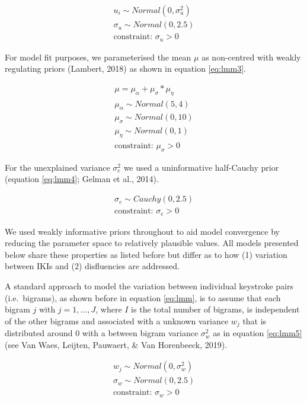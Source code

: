 \documentclass[english,jou,floatsintext]{apa7}
\begin{document}
\[
\tag{2}
\begin{aligned}
u_i \sim Normal(0,\sigma_u^2)\\
\sigma_u \sim Normal(0,2.5)\\
\text{constraint: } \sigma_u >0 
\end{aligned}
\label{eq:lmm2}
\]

For model fit purposes, we parameterised the mean \(\mu\) as non-centred with weakly regulating priors (Lambert, 2018) as shown in equation \ref{eq:lmm3}.

\[
\tag{3}
\begin{aligned}
\mu = \mu_{\alpha} + \mu_{\sigma} * \mu_{\eta}\\
\mu_{\alpha} \sim Normal(5,4)\\
\mu_{\sigma} \sim Normal(0,10)\\
\mu_{\eta} \sim Normal(0,1)\\
\text{constraint: }\mu_{\sigma}>0 
\end{aligned}
\label{eq:lmm3}
\]

For the unexplained variance \(\sigma_e^2\) we used a uninformative half-Cauchy prior (equation \ref{eq:lmm4}; Gelman et al., 2014).

\[
\tag{4}
\begin{aligned}
\sigma_e \sim Cauchy(0,2.5)\\
\text{constraint: }\sigma_e>0 
\end{aligned}
\label{eq:lmm4}
\]

We used weakly informative priors throughout to aid model convergence by reducing the parameter space to relatively plausible values. All models presented below share these properties as listed before but differ as to how (1) variation between IKIs and (2) disfluencies are addressed.

A standard approach to model the variation between individual keystroke pairs (i.e.~bigrams), as shown before in equation \ref{eq:lmm}, is to assume that each bigram \(j\) with \(j = 1, \dots, J\), where \(I\) is the total number of bigrams, is independent of the other bigrams and associated with a unknown variance \(w_j\) that is distributed around 0 with a between bigram variance \(\sigma_w^2\) as in equation \ref{eq:lmm5} (see Van Waes, Leijten, Pauwaert, \& Van Horenbeeck, 2019).

\[
\tag{5}
\begin{aligned}
w_j \sim Normal(0,\sigma_w^2)\\
\sigma_w \sim Normal(0,2.5)\\
\text{constraint: }\sigma_w >0 
\end{aligned}
\label{eq:lmm5}
\]
\end{document}
